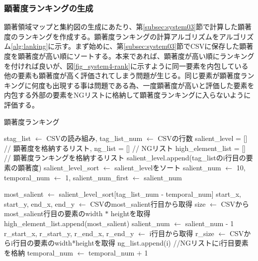 \subsubsection{顕著度ランキングの生成}\label{subsec:system04-1}
\par 顕著領域マップと集約図の生成にあたり、第\ref{subsec:system03}節で計算した顕著度のランキングを作成する。顕著度ランキングの計算アルゴリズムをアルゴリズム\ref{alg:lanking}に示す。まず始めに、第\ref{subsec:system03}節でCSVに保存した顕著度を顕著度が高い順にソートする。本来であれば、顕著度が高い順にランキングを付ければ良いが、図\ref{fig_system4-rank}に示すように同一要素を内包している他の要素も顕著度が高く評価されてしまう問題が生じる。同じ要素が顕著度ランキングに何度も出現する事は問題である為、一度顕著度が高いと評価した要素を内包する外部の要素をNGリストに格納して顕著度ランキングに入らないように評価する。



\newpage
\begin{algorithm}[H]
    \caption{顕著度ランキング}
    \label{alg:lanking}
    \begin{algorithmic}

    \State stag\_list $ \leftarrow $ CSVの読み組み, tag\_list\_num $ \leftarrow $ CSVの行数
    \State salient\_level = [] // 顕著度を格納するリスト, ng\_list = [] // NGリスト
    \State high\_element\_list = [] // 顕著度ランキングを格納するリスト
        \State salient\_level.append(tag\_listのi行目の要素の顕著度)
    \EndFor    
    \State salient\_level\_sort $ \leftarrow $ salient\_levelをソート
    \State salient\_num $ \leftarrow $ 10, temporal\_num $ \leftarrow $ 1, salient\_num\_first $ \leftarrow $ salient\_num

        \State most\_salient $ \leftarrow $ salient\_level\_sort[tag\_list\_num - temporal\_num]
        \State start\_x, start\_y, end\_x, end\_y $\leftarrow$ CSVのmost\_salient行目から取得
        \State size $\leftarrow$ CSVからmost\_salient行目の要素のwidth $*$ heightを取得
        \State high\_element\_list.append(most\_salient)
        \State salient\_num $\leftarrow$ salient\_num - 1
        \State r\_start\_x, r\_start\_y, r\_end\_x, r\_end\_y $\leftarrow$ i行目から取得
        \State r\_size $\leftarrow$ CSVからi行目の要素のwidth*heightを取得
        \State ng\_list.append(i) //NGリストにi行目要素を格納
        \EndIf
        \EndIf
        \EndIf
        \EndFor 
        \EndIf
        \Else
        \State temporal\_num $\leftarrow$ temporal\_num $+$ 1
        \EndIf
    \EndWhile
    \end{algorithmic}
\end{algorithm}

